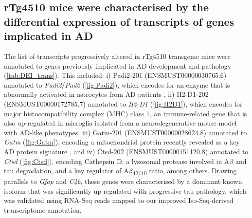 \clearpage
\subsection{rTg4510 mice were characterised by the differential expression of transcripts of genes implicated in AD}
\label{ch5: diffisoexp}
The list of transcripts progressively altered in rTg4510 transgenic mice were annotated to genes previously implicated in AD development and pathology (\cref{tab:DEI_trans}). This included: i) Padi2-201 (ENSMUST00000030765.6) annotated to \textit{Padi2}/\textit{Pad2} (\cref{fig:Padi2}), which encodes for an enzyme that is abnormally activated in astrocytes from AD patients \cite{A2005}, ii) H2-D1-202 (ENSMUST00000172785.7) annotated to \textit{H2-D1} (\cref{fig:H2D1}), which encodes for major histocompatibility complex (MHC) class 1, an immune-related gene that is also up-regulated in microglia isolated from a neurodegenerative mouse model with AD-like phenotypes\cite{Mathys2017}, iii) Gatm-201 (ENSMUST00000028624.8) annotated to \textit{Gatm} (\cref{fig:Gatm}), encoding a mitochondrial protein recently revealed as a key AD protein signature \cite{Wang2020}, and iv) Ctsd-202 (ENSMUST00000151120.8) annotated to \textit{Ctsd} (\cref{fig:Ctsd}), encoding Cathepsin D, a lysosomal protease involved in A$\beta$ \cite{JR1996} and tau \cite{A1997} degradation, and a key regulator of A$\beta$\textsubscript{42/40} ratio\cite{Suire2020}, among others. Drawing parallels to \textit{Gfap} and \textit{C4b}, these genes were characterised by a dominant known isoform that was significantly up-regulated with progressive tau pathology, which was validated using RNA-Seq reads mapped to our improved Iso-Seq-derived transcriptome annotation. 


